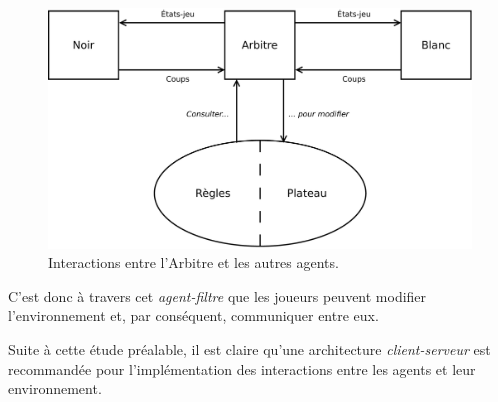 \begin{figure}[H] 
\centering
\includegraphics[width=\textwidth]{files/env/arbitre} 
\caption{Interactions entre l'Arbitre et les autres agents.} 
\label{arbitre}
\end{figure}

C'est donc à travers cet \emph{agent-filtre} que les joueurs peuvent modifier l'environnement et, par conséquent, communiquer entre eux.

Suite à cette étude préalable, il est claire qu'une architecture \emph{client-serveur} est recommandée pour l'implémentation des interactions entre les agents et leur environnement.